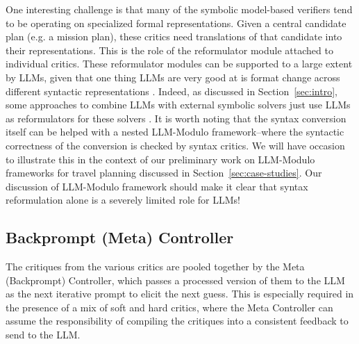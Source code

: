 \documentclass{article}
\newcommand{\bnote}[1]{\color{black}#1\color{black}}
\newcommand{\rao}[1]{\noindent\textcolor{red}{#1}}
\theoremstyle{plain}
\theoremstyle{definition}
\theoremstyle{remark}
\begin{document}

One interesting challenge is that many of the symbolic model-based
verifiers tend to be operating on specialized formal
representations. Given a central candidate plan (e.g. a mission plan),
these critics need translations of that candidate into their
representations. This is the role of the  reformulator module attached
to individual critics. These reformulator modules can be supported to a large extent by LLMs,
given that one thing LLMs are very good at is format change across different syntactic representations \cite{olmo2021gpt3}.
%
Indeed, as discussed in Section~\ref{sec:intro}, some approaches to
combine LLMs with external symbolic solvers just use LLMs as
reformulators for these solvers \cite{liu2023llm+,pan2023logic}.
%
\bnote{It is worth noting that the syntax conversion itself can be helped with
a nested LLM-Modulo framework--where the syntactic correctness of the
conversion is checked by syntax critics. We will have occasion to
illustrate this in the context of our preliminary work on  LLM-Modulo
frameworks for travel planning discussed in
Section~\ref{sec:case-studies}. }
Our discussion of LLM-Modulo framework should make it clear that syntax
reformulation alone is a severely limited role for LLMs!


\subsection{Backprompt (Meta) Controller}
\label{sec:meta-controller}

The critiques from the various critics are pooled together by the Meta (Backprompt) Controller, which passes a processed version of them to the LLM as the next iterative prompt to elicit the next guess. 
This is especially required in the presence of a mix of soft and hard critics, where the Meta Controller can assume the responsibility of compiling the critiques into a consistent feedback to send to the LLM.
\end{document}
